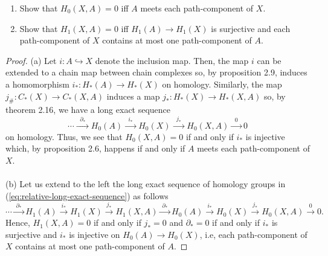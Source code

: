 \begin{problem}[Hatcher {\S}2.1, Ex.\,16]
\begin{enumerate}[label=(\alph*)]
\item Show that $H_0(X,A)=0$ iff $A$ meets each path-component of $X$.
\item Show that $H_1(X,A)=0$ iff $H_1(A)\to H_1(X)$ is surjective and each
  path-component of $X$ contains at most one path-component of $A$.
\end{enumerate}
\end{problem}
\begin{proof}
(a) Let $i\colon A\hookrightarrow X$ denote the inclusion map. Then, the
map $i$ can be extended to a chain map between chain complexes so, by
proposition 2.9, induces a homomorphism $i_*\colon H_*(A)\to H_*(X)$ on
homology. Similarly, the map $j_\#\colon C_*(X)\to C_*(X,A)$ induces a map
$j_*\colon H_*(X)\to H_*(X,A)$ so, by theorem 2.16, we have a long exact
sequence
\begin{equation}
\label{eq:relative-long-exact-sequence}
\cdots\xrightarrow{\;\;\partial_*\;\;}
H_0(A)\xrightarrow{\;\;i_*\;\;}
H_0(X)\xrightarrow{\;\;j_*\;\;}
H_0(X,A)\xrightarrow{\;\;0\;\;}
0
\end{equation}
on homology. Thus, we see that $H_0(X,A)=0$ if and only if $i_*$ is
injective which, by proposition 2.6, happens if and only if $A$ meets each
path-component of $X$.
\\\\
(b) Let us extend to the left the long exact sequence of homology groups in
(\ref{eq:relative-long-exact-sequence}) as follows
\begin{equation}
  \label{eq:relative-short-exact-sequence-2}
\cdots\xrightarrow{\;\partial_*\;}
H_1(A)\xrightarrow{\;i_*\;}
H_1(X)\xrightarrow{\;j_*\;}
H_1(X,A)\xrightarrow{\;\partial_*\;}
H_0(A)\xrightarrow{\;i_*\;}
H_0(X)\xrightarrow{\;j_*\;}
H_0(X,A)\xrightarrow{\;0\;}0.
\end{equation}
Hence, $H_1(X,A)=0$ if and only if $j_*=0$ and $\partial_*=0$ if and only
if $i_*$ is surjective and $i_*$ is injective on $H_0(A)\to H_0(X)$, i.e,
each path-component of $X$ contains at most one path-component of $A$.
\end{proof}
\newpage


